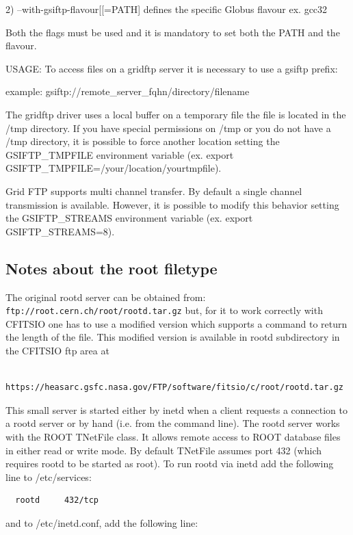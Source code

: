 \documentclass[11pt]{book}
\begin{document}
2)  --with-gsiftp-flavour[[=PATH] defines the specific Globus flavour
        ex. gcc32

Both the flags must be used and it is mandatory to set  both the PATH and the
flavour.

USAGE: To access files on a gridftp server it is necessary to use a gsiftp prefix:

example: gsiftp://remote\_server\_fqhn/directory/filename

The gridftp driver uses a local buffer on a temporary file the file is located
in the /tmp directory. If you have special permissions on /tmp or you do not have a /tmp
directory, it is possible to force another location setting the GSIFTP\_TMPFILE environment
variable (ex. export GSIFTP\_TMPFILE=/your/location/yourtmpfile).

Grid FTP supports multi channel transfer. By default a single channel transmission is
available. However, it is possible to modify this behavior setting the GSIFTP\_STREAMS
environment variable (ex. export GSIFTP\_STREAMS=8).



\subsection{Notes about the root filetype}

The original rootd server can be obtained from:
\verb-ftp://root.cern.ch/root/rootd.tar.gz-
but, for it to work correctly with CFITSIO one has to use a modified
version which supports a command to return the length of the file.
This modified version is available in rootd subdirectory
in the CFITSIO ftp area at

\begin{verbatim}
      https://heasarc.gsfc.nasa.gov/FTP/software/fitsio/c/root/rootd.tar.gz
\end{verbatim}

This small server is started either by inetd when a client requests a
connection to a rootd server or by hand (i.e. from the command line).
The rootd server works with the ROOT TNetFile class. It allows remote
access to ROOT database files in either read or write mode. By default
TNetFile assumes port 432 (which requires rootd to be started as root).
To run rootd via inetd add the following line to /etc/services:

\begin{verbatim}
  rootd     432/tcp
\end{verbatim}
and to /etc/inetd.conf, add the following line:
\end{document}
